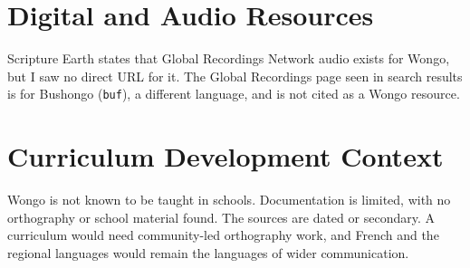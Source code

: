 \documentclass[12pt]{article}
\begin{document}
\section{Digital and Audio Resources}
Scripture Earth states that Global Recordings Network audio exists for Wongo, but I saw no direct URL for it. The Global Recordings page seen in search results is for Bushongo (\texttt{buf}), a different language, and is not cited as a Wongo resource.

\section{Curriculum Development Context}
Wongo is not known to be taught in schools. Documentation is limited, with no orthography or school material found. The sources are dated or secondary. A curriculum would need community-led orthography work, and French and the regional languages would remain the languages of wider communication.
\end{document}
